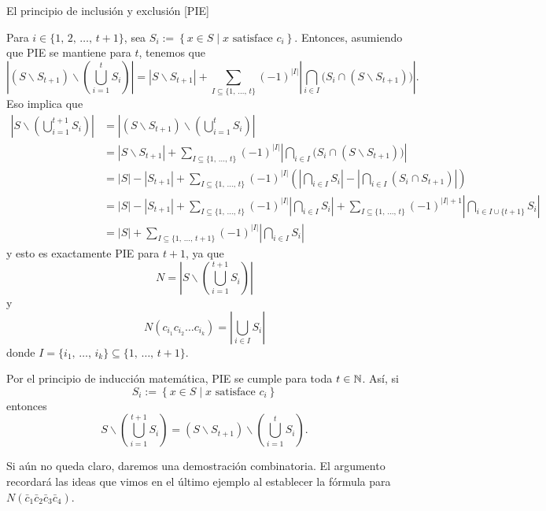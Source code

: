 \begin{theorem}{El principio de inclusión y exclusión [PIE]}{}
\begin{enumerate}[label=\roman*)]
        Para $i \in \{ 1, \, 2, \, \dots, \, t + 1 \}$, sea $S_i := \left\{ x \in S \mid x \text{ satisface } c_i \right\}$. Entonces, asumiendo que PIE se mantiene para $t$, tenemos que
        $$\left| (S \backslash S_{t+1}) \backslash \left( \bigcup_{i=1}^{t} S_i \right) \right| = |S \backslash S_{t+1}| + \sum_{I \subseteq \{1, \, \dots, \, t \} } (-1)^{|I|} \left| \bigcap_{i \in I} \big(S_i \cap (S \backslash S_{t+1}) \big) \right| .$$
        Eso implica que
        \begin{align*}
            \left| S \backslash \left( \bigcup_{i=1}^{t+1} S_i \right) \right| & = \left|(S \backslash S_{t+1}) \backslash \left( \bigcup_{i=1}^{t} S_i \right) \right| \\
            & = |S \backslash S_{t+1}| + \sum_{I \subseteq \{1, \, \dots, \, t \} } (-1)^{|I|} \left| \bigcap_{i \in I} \big(S_i \cap (S \backslash S_{t+1}) \big) \right| \\
            & = |S| - |S_{t+1}| + \sum_{I \subseteq \{1, \, \dots, \, t \} } (-1)^{|I|} \left( \left| \bigcap_{i \in I} S_i \right| - \left| \bigcap_{i \in I} (S_i \cap S_{t+1}) \right| \right) \\
            & = |S| - |S_{t+1}| + \sum_{I \subseteq \{1, \, \dots, \, t \} } (-1)^{|I|} \left| \bigcap_{i \in I} S_i \right| + \sum_{I \subseteq \{ 1, \, \dots, \, t \} } (-1)^{|I| + 1} \left| \bigcap_{i \in I \cup \{ t + 1 \} } S_i \right| \\
            & = |S| + \sum_{I \subseteq \{ 1, \, \dots, \, t+1 \} } (-1)^{|I|} \left| \bigcap_{i \in I} S_i \right|
        \end{align*}
        y esto es exactamente PIE para $t + 1$, ya que
        $$N = \left| S \backslash \left( \bigcup_{i=1}^{t+1} S_i \right) \right|$$
        y
        $$N(c_{i_1} c_{i_2} \dots c_{i_k}) = \left| \bigcup_{i \in I} S_i \right|$$
        donde $I = \{ i_1, \, \dots, \, i_k \} \subseteq \{ 1, \, \dots, \, t + 1 \}$.
    \end{enumerate}
    Por el principio de inducción matemática, PIE se cumple para toda $t \in \NN$. Así, si
    $$S_i := \left\{ x \in S \mid x \text{ satisface } c_i \right\}$$
    entonces
    $$S \backslash \left( \bigcup_{i=1}^{t+1} S_i \right)= (S \backslash S_{t+1}) \backslash \left( \bigcup_{i=1}^{t} S_i \right).$$
    
    Si aún no queda claro, daremos una demostración combinatoria. El argumento recordará las ideas que vimos en el último ejemplo al establecer la fórmula para $N(\bar{c}_1 \bar{c}_2 \bar{c}_3 \bar{c}_4)$.
    

\end{theorem}

